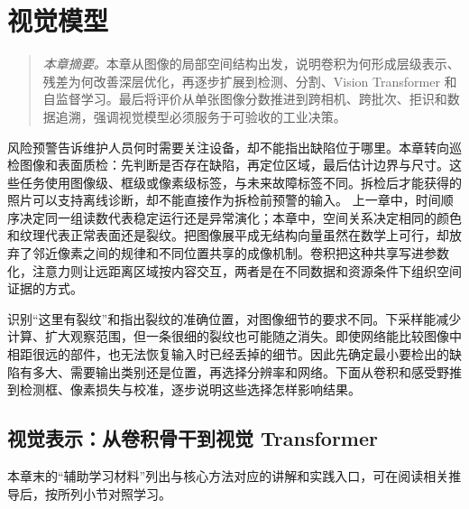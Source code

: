 ﻿\chapter{视觉模型}
\begin{quote}\small
\textit{本章摘要。}本章从图像的局部空间结构出发，说明卷积为何形成层级表示、残差为何改善深层优化，再逐步扩展到检测、分割、Vision Transformer 和自监督学习。最后将评价从单张图像分数推进到跨相机、跨批次、拒识和数据追溯，强调视觉模型必须服务于可验收的工业决策。
\end{quote}
风险预警告诉维护人员何时需要关注设备，却不能指出缺陷位于哪里。本章转向巡检图像和表面质检：先判断是否存在缺陷，再定位区域，最后估计边界与尺寸。这些任务使用图像级、框级或像素级标签，与未来故障标签不同。拆检后才能获得的照片可以支持离线诊断，却不能直接作为拆检前预警的输入。
上一章中，时间顺序决定同一组读数代表稳定运行还是异常演化；本章中，空间关系决定相同的颜色和纹理代表正常表面还是裂纹。把图像展平成无结构向量虽然在数学上可行，却放弃了邻近像素之间的规律和不同位置共享的成像机制。卷积把这种共享写进参数化，注意力则让远距离区域按内容交互，两者是在不同数据和资源条件下组织空间证据的方式。

识别“这里有裂纹”和指出裂纹的准确位置，对图像细节的要求不同。下采样能减少计算、扩大观察范围，但一条很细的裂纹也可能随之消失。即使网络能比较图像中相距很远的部件，也无法恢复输入时已经丢掉的细节。因此先确定最小要检出的缺陷有多大、需要输出类别还是位置，再选择分辨率和网络。下面从卷积和感受野推到检测框、像素损失与校准，逐步说明这些选择怎样影响结果。
\section{视觉表示：从卷积骨干到视觉 Transformer}

本章末的“辅助学习材料”列出与核心方法对应的讲解和实践入口，可在阅读相关推导后，按所列小节对照学习。

